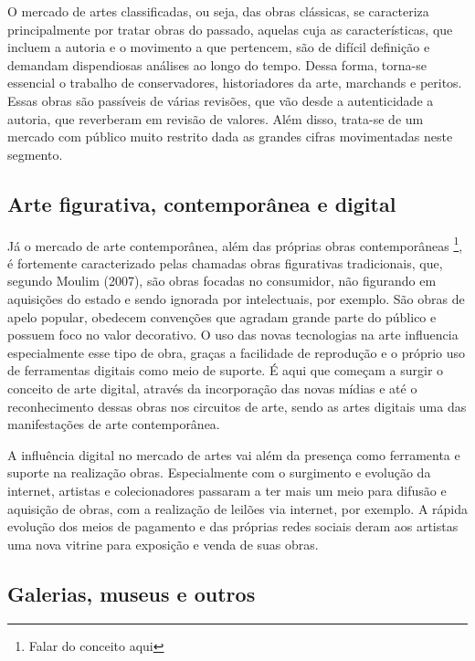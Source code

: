 O mercado de artes classificadas, ou seja, das obras clássicas, se caracteriza principalmente por tratar obras do passado, aquelas cuja as características, que incluem a autoria e o movimento a que pertencem, são de difícil definição e demandam dispendiosas análises ao longo do tempo. Dessa forma, torna-se essencial o trabalho de conservadores, historiadores da arte, marchands e peritos. Essas obras são passíveis de várias revisões, que vão desde a autenticidade a autoria, que reverberam em revisão de valores. Além disso, trata-se de um mercado com público muito restrito dada as grandes cifras movimentadas neste segmento.

\subsection{Arte figurativa, contemporânea e digital}
\label{subsec: Arte popular, contemporânea e digital}


Já o mercado de arte contemporânea, além das próprias obras contemporâneas \footnote{Falar do conceito aqui}, é fortemente caracterizado pelas chamadas obras figurativas tradicionais, que, segundo Moulim (2007), são obras focadas no consumidor, não figurando em aquisições do estado e sendo ignorada por intelectuais, por exemplo. São obras de apelo popular, obedecem convenções que agradam grande parte do público e possuem foco no valor decorativo. O uso das novas tecnologias na arte influencia especialmente esse tipo de obra, graças a facilidade de reprodução e o próprio uso de ferramentas digitais como meio de suporte. É aqui que começam a surgir o conceito de arte digital, através da incorporação das novas mídias e até o reconhecimento dessas obras nos circuitos de arte, sendo as artes digitais uma das manifestações de arte contemporânea.

A influência digital no mercado de artes vai além da presença como ferramenta e suporte na realização obras. Especialmente com o surgimento e evolução da internet, artistas e colecionadores passaram a ter mais um meio para difusão e aquisição de obras, com a realização de leilões via internet, por exemplo. A rápida evolução dos meios de pagamento e das próprias redes sociais deram aos artistas uma nova vitrine para exposição e venda de suas obras. 








\subsection{Galerias, museus e outros}
\label{subsec: galerias, museus e outros}

